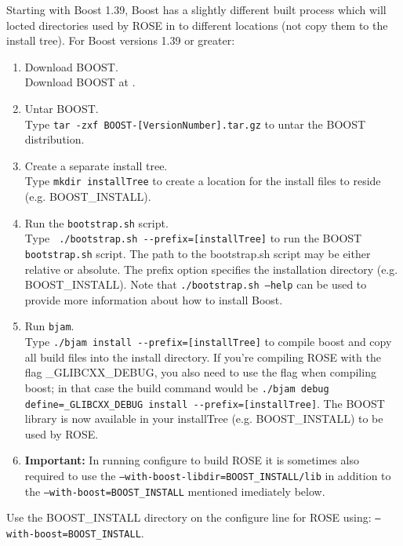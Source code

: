 Starting with Boost 1.39, Boost has a slightly different built process which
will locted directories used by ROSE in to different locations (not copy them to the
install tree). For Boost versions 1.39 or greater:
\begin{enumerate}
     \item Download BOOST. \\
       Download BOOST at .
     \item Untar BOOST. \\
       Type {\tt tar -zxf BOOST-[VersionNumber].tar.gz} to untar the BOOST distribution.
     \item Create a separate install tree. \\
           Type {\tt mkdir installTree} to create a location for the install files to reside (e.g. BOOST\_INSTALL).
     \item Run the {\tt bootstrap.sh} script. \\
           Type \verb! ./bootstrap.sh --prefix=[installTree]! 
           to run the BOOST {\tt bootstrap.sh} script.  The path to the bootstrap.sh script 
           may be either relative or absolute. The prefix option specifies the
           installation directory (e.g. BOOST\_INSTALL). Note that 
           {\tt ./bootstrap.sh --help} can be used to provide more information about how
           to install Boost.
     \item Run {\tt bjam}. \\
           Type \verb!./bjam install --prefix=[installTree]! to compile boost and
           copy all build files into the install directory. If you're compiling ROSE with the flag \_GLIBCXX\_DEBUG, you also
           need to use the flag when compiling boost; in that case the build command would be
           \verb!./bjam debug define=_GLIBCXX_DEBUG install --prefix=[installTree]!. 
            The  BOOST library is now available in your 
           installTree (e.g. BOOST\_INSTALL) to be used by ROSE.
           \item {\bf Important:} In running configure to build ROSE it is sometimes also required to use the 
           {\tt --with-boost-libdir=BOOST\_INSTALL/lib} in addition to the {\tt --with-boost=BOOST\_INSTALL}
           mentioned imediately below.
\end{enumerate}

Use the BOOST\_INSTALL directory on the configure line for ROSE using: {\tt --with-boost=BOOST\_INSTALL}.


